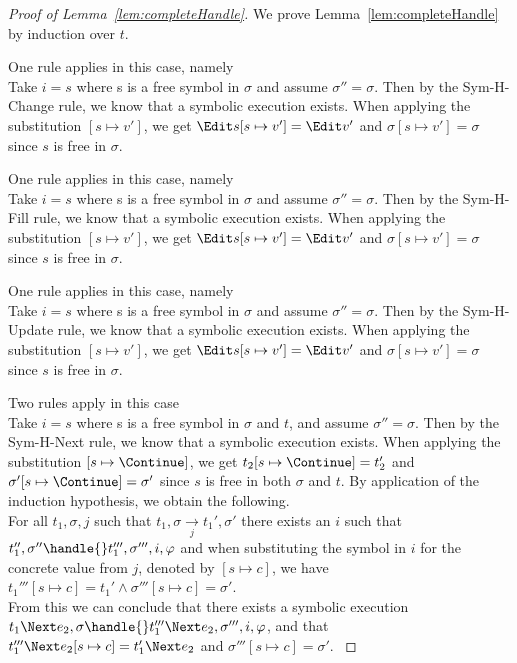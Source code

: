 \begin{proof}[Proof of Lemma~\ref{lem:completeHandle}]

  We prove Lemma~\ref{lem:completeHandle} by induction over $t$.\\

  {One rule applies in this case, namely \\
  Take $i=s$ where s is a free symbol in $\sigma$ and assume $\sigma''=\sigma$.
  Then by the Sym-H-Change rule,
  we know that a symbolic execution exists.
  When applying the substitution $[s\mapsto v']$,
  we get $\Edit s[s\mapsto v'] = \Edit v'$ and $\sigma[s\mapsto v']=\sigma$ since $s$ is free in $\sigma$.

  }

  {One rule applies in this case, namely \\
  Take $i=s$ where s is a free symbol in $\sigma$ and assume $\sigma''=\sigma$.
  Then by the Sym-H-Fill rule,
  we know that a symbolic execution exists.
  When applying the substitution $[s\mapsto v']$,
  we get $\Edit s[s\mapsto v'] = \Edit v'$ and $\sigma[s\mapsto v']=\sigma$ since $s$ is free in $\sigma$. }

  {One rule applies in this case, namely \\
  Take $i=s$ where s is a free symbol in $\sigma$ and assume $\sigma''=\sigma$.
  Then by the Sym-H-Update rule,
  we know that a symbolic execution exists.
  When applying the substitution $[s\mapsto v']$,
  we get $\Edit s[s\mapsto v'] = \Edit v'$ and $\sigma[s\mapsto v']=\sigma$ since $s$ is free in $\sigma$. }

  {Two rules apply in this case\\
    {
    Take $i=s$ where s is a free symbol in $\sigma$ and $t$, and assume $\sigma''=\sigma$.
    Then by the Sym-H-Next rule,
    we know that a symbolic execution exists.
    When applying the substitution $[s\mapsto \Continue]$,
    we get $t_2[s\mapsto \Continue] = t_2'$ and $\sigma'[s\mapsto \Continue]=\sigma'$ since $s$ is free in both $\sigma$ and $t$.
    }
    {
    By application of the induction hypothesis, we obtain the following.\\
    For all $t_1,\sigma,j$ such that $t_1,\sigma\xrightarrow[j]{}t_1',\sigma'$ there exists an $i$ such that $t_1'',\sigma''\handle{}t_1''',\sigma''',i,\phi$ and when substituting the symbol in $i$ for the concrete value from $j$, denoted by $[s\mapsto c]$, we have $t_1'''[s\mapsto c] = t_1'\land \sigma'''[s\mapsto c]=\sigma'$.\\
    From this we can conclude that there exists a symbolic execution $t_1\Next e_2,\sigma\handle{} t_1'''\Next e_2,\sigma''',i,\phi$, and that $t_1'''\Next e_2[s\mapsto c] = t_1'\Next e_2$ and $\sigma'''[s\mapsto c]=\sigma'$.
    }
  }



\end{proof}
